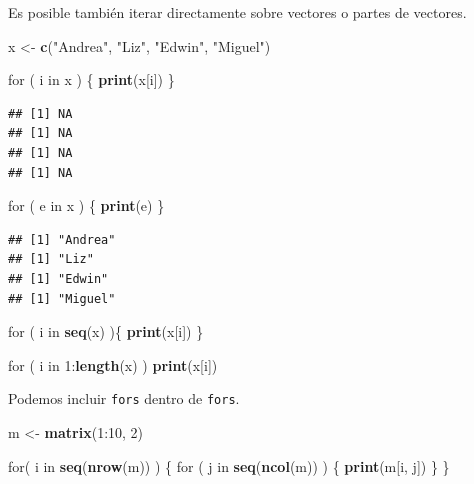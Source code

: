 \documentclass[]{article}
\newenvironment{Shaded}{\begin{snugshade}}{\end{snugshade}}
\newcommand{\KeywordTok}[1]{\textcolor[rgb]{0.13,0.29,0.53}{\textbf{{#1}}}}
\newcommand{\DecValTok}[1]{\textcolor[rgb]{0.00,0.00,0.81}{{#1}}}
\newcommand{\StringTok}[1]{\textcolor[rgb]{0.31,0.60,0.02}{{#1}}}
\newcommand{\NormalTok}[1]{{#1}}
\begin{document}
Es posible también iterar directamente sobre vectores o partes de
vectores.

\begin{Shaded}
\begin{Highlighting}[]
\NormalTok{x <-}\StringTok{ }\KeywordTok{c}\NormalTok{(}\StringTok{"Andrea"}\NormalTok{, }\StringTok{"Liz"}\NormalTok{, }\StringTok{"Edwin"}\NormalTok{, }\StringTok{"Miguel"}\NormalTok{)}

\NormalTok{for ( i in x ) \{}
  \KeywordTok{print}\NormalTok{(x[i])}
\NormalTok{\}}
\end{Highlighting}
\end{Shaded}

\begin{verbatim}
## [1] NA
## [1] NA
## [1] NA
## [1] NA
\end{verbatim}

\begin{Shaded}
\begin{Highlighting}[]
\NormalTok{for ( e in x ) \{}
  \KeywordTok{print}\NormalTok{(e)}
\NormalTok{\}}
\end{Highlighting}
\end{Shaded}

\begin{verbatim}
## [1] "Andrea"
## [1] "Liz"
## [1] "Edwin"
## [1] "Miguel"
\end{verbatim}

\begin{Shaded}
\begin{Highlighting}[]
\NormalTok{for ( i in }\KeywordTok{seq}\NormalTok{(x) )\{}
  \KeywordTok{print}\NormalTok{(x[i])}
\NormalTok{\}}

\NormalTok{for ( i in }\DecValTok{1}\NormalTok{:}\KeywordTok{length}\NormalTok{(x) ) }\KeywordTok{print}\NormalTok{(x[i])}
\end{Highlighting}
\end{Shaded}

Podemos incluir \texttt{fors} dentro de \texttt{fors}.

\begin{Shaded}
\begin{Highlighting}[]
\NormalTok{m <-}\StringTok{ }\KeywordTok{matrix}\NormalTok{(}\DecValTok{1}\NormalTok{:}\DecValTok{10}\NormalTok{, }\DecValTok{2}\NormalTok{)}

\NormalTok{for( i in }\KeywordTok{seq}\NormalTok{(}\KeywordTok{nrow}\NormalTok{(m)) ) \{}
  \NormalTok{for ( j in }\KeywordTok{seq}\NormalTok{(}\KeywordTok{ncol}\NormalTok{(m)) ) \{}
    \KeywordTok{print}\NormalTok{(m[i, j])}
  \NormalTok{\}}
\NormalTok{\}}
\end{Highlighting}
\end{Shaded}
\end{document}
